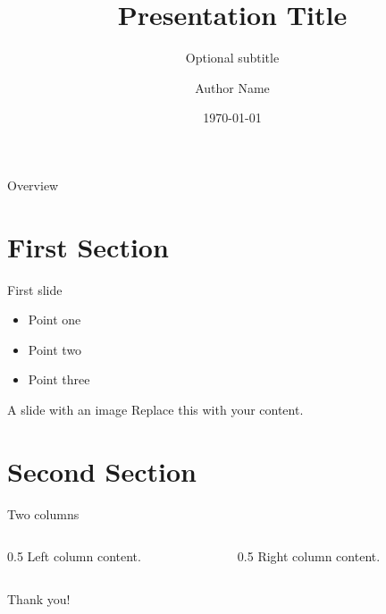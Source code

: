 \documentclass[aspectratio=169]{beamer}
\title{Presentation Title}
\subtitle{Optional subtitle}
\author{Author Name}
\institute{Institute / Organisation}
\date{\today}
\begin{document}
\maketitle

\begin{frame}{Overview}
  \tableofcontents
\end{frame}

\section{First Section}

\begin{frame}{First slide}
  \begin{itemize}
    \item Point one
    \item Point two
    \item Point three
  \end{itemize}
\end{frame}

\begin{frame}{A slide with an image}
  \centering
  Replace this with your content.
\end{frame}

\section{Second Section}

\begin{frame}{Two columns}
  \begin{columns}
    \begin{column}{0.5\textwidth}
      Left column content.
    \end{column}
    \begin{column}{0.5\textwidth}
      Right column content.
    \end{column}
  \end{columns}
\end{frame}

\begin{frame}[standout]
  Thank you!
\end{frame}
\end{document}
